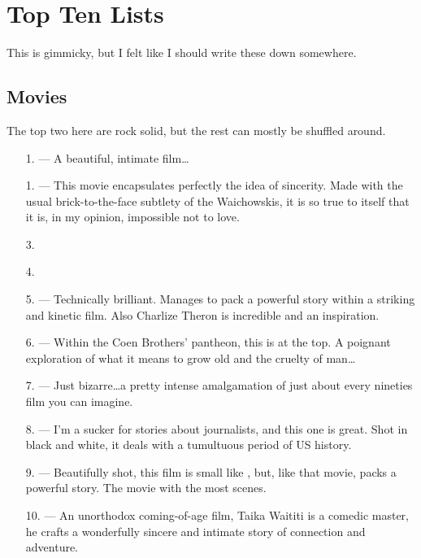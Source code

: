 \documentclass[../butidigress.tex]{subfiles}
\begin{document}
\chapter{Top Ten Lists}\label{chap:topten}
\newpage

This is gimmicky, but I felt like I should write these down somewhere.
\section{Movies}\label{sec:moviestopten}
The top two here are rock solid, but the rest can mostly be shuffled around.

\begin{itemize}
    \item[1.] \textbf{} --- A beautiful, intimate film\ldots{}
    \item[1.] \textbf{} --- This movie encapsulates perfectly the idea of sincerity. Made with the usual brick-to-the-face subtlety of the Waichowskis, it is so true to itself that it is, in my opinion, impossible not to love.
    \item[3.]
    \item[4.]
    \item[5.] \textbf{} --- Technically brilliant. Manages to pack a powerful story within a striking and kinetic film. Also Charlize Theron is incredible and an inspiration.
    \item[6.] \textbf{} --- Within the Coen Brothers' pantheon, this is at the top. A poignant exploration of what it means to grow old and the cruelty of man\ldots
    \item[7.] \textbf{} --- Just bizarre\ldots a pretty intense amalgamation of just about every nineties film you can imagine.
    \item[8.] \textbf{} --- I'm a sucker for stories about journalists, and this one is great. Shot in black and white, it deals with a tumultuous period of US history.
    \item[9.] \textbf{} --- Beautifully shot, this film is small like , but, like that movie, packs a powerful story. The movie with the most  scenes.
    \item[10.] \textbf{} --- An unorthodox coming-of-age film, Taika Waititi is a comedic master, he crafts a wonderfully sincere and intimate story of connection and adventure.
\end{itemize}
\end{document}
